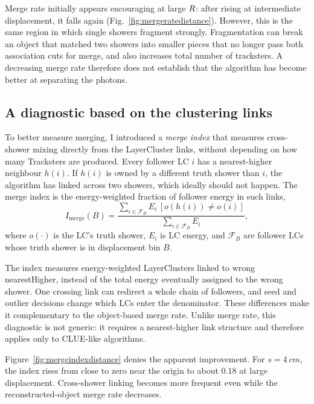 Merge rate initially appears encouraging at large $R$: after rising at intermediate displacement, it falls again
(Fig.~\ref{fig:mergeratedistance}). However, this is the same region in which
single showers fragment strongly. Fragmentation can break an object that matched
two showers into smaller pieces that no longer pass both association cuts for merge, and also increases total number of tracksters.
A decreasing merge rate therefore does not establish that the algorithm has
become better at separating the photons.

\subsection{A diagnostic based on the clustering links}

To better measure merging, I introduced a
\emph{merge index} that measures cross-shower mixing directly from the
LayerCluster links, without depending on how many Tracksters are produced. Every
follower LC $i$ has a nearest-higher neighbour $h(i)$. If $h(i)$ is owned by
a different truth shower than $i$, the algorithm has linked across two showers, which ideally should not happen. The merge index is the energy-weighted fraction of follower energy in
such links,
\begin{equation}
 I_{\mathrm{merge}}(B)=
 \frac{\sum_{i\in\mathcal{F}_B}E_i\,
 [o(h(i))\ne o(i)]}
 {\sum_{i\in\mathcal{F}_B}E_i},
 \label{eq:mergeindex}
\end{equation}
where $o(\cdot)$ is the LC's truth shower, $E_i$ is LC energy, and $\mathcal{F}_B$
 are follower LCs whose truth shower is in
displacement bin $B$.

The index measures energy-weighted LayerClusters linked to wrong nearestHigher, instead of the total energy eventually
assigned to the wrong shower. One crossing link can redirect a whole chain of
followers, and seed and outlier decisions change which LCs enter the
denominator. These differences make it complementary to the object-based merge
rate. Unlike merge rate, this diagnostic is not generic: it requires a nearest-higher link structure and therefore applies only to CLUE-like algorithms.

Figure~\ref{fig:mergeindexdistance} denies the apparent improvement. For
$s=\SI{4}{cm}$, the index rises from close to zero near the origin to about $0.18$
at large displacement. Cross-shower linking becomes more frequent even while
the reconstructed-object merge rate decreases.

